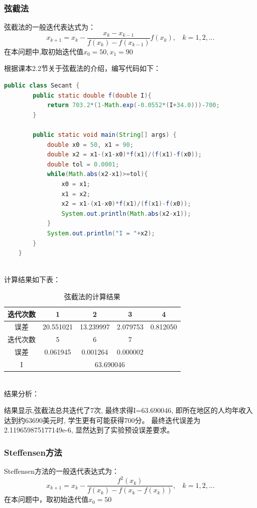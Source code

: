 \documentclass[12pt,a4paper]{article}
\begin{document}
\subsubsection{弦截法}
弦截法的一般迭代表达式为：
\begin{equation}
    x_{k+1}=x_k-\frac{x_k-x_{k-1}}{f(x_k)-f(x_{k-1})}f(x_k),~~~~k=1,2,\dots
\end{equation}
在本问题中,取初始迭代值$x_0=50, x_1=90$

根据课本2.2节关于弦截法的介绍，编写代码如下：
\begin{lstlisting}[language={java}]
    public class Secant {
        public static double f(double I){
            return 703.2*(1-Math.exp(-0.0552*(I+34.0)))-700;
        }

        public static void main(String[] args) {
            double x0 = 50, x1 = 90;
            double x2 = x1-(x1-x0)*f(x1)/(f(x1)-f(x0));
            double tol = 0.0001;
            while(Math.abs(x2-x1)>=tol){
                x0 = x1;
                x1 = x2;
                x2 = x1-(x1-x0)*f(x1)/(f(x1)-f(x0));
                System.out.println(Math.abs(x2-x1));
            }
            System.out.println("I = "+x2);
        }
    }
\end{lstlisting}
~\\
计算结果如下表：
\begin{table}[ht]
    \centering
    \begin{tabular}{|c|c|c|c|c|} 
     \hline
     迭代次数 & 1 & 2 & 3 & 4 \\ [0.5ex] 
     \hline
     误差 & 20.551021 & 13.239997 & 2.079753 & 0.812050 \\ 
     \hline
     迭代次数 & 5 & 6 & 7 & \\
     \hline
     误差 & 0.061945 & 0.001264 & 0.000002 & \\
     \hline
     I & \multicolumn{4}{c|}{63.690046} \\
     \hline
    \end{tabular}
    \caption{弦截法的计算结果}
    \label{table:2}
\end{table}
~\\
结果分析：

结果显示,弦截法总共迭代了7次,
最终求得I=63.690046,
即所在地区的人均年收入达到约63690美元时,
学生更有可能获得700分。
最终迭代误差为2.119659875177149e-6,
显然达到了实验预设误差要求。

\subsubsection{Steffensen方法}
Steffensen方法的一般迭代表达式为：
\begin{equation}
    x_{k+1}=x_k-\frac{f^2(x_k)}{f(x_k)-f(x_k-f(x_k))},~~~~k=1,2,\dots
\end{equation}
在本问题中，取初始迭代值$x_0=50$
\end{document}
